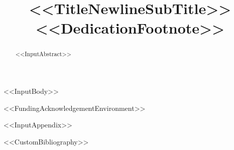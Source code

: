 \documentclass[%
journal = <<TemplateBaseName>>,
manuscript = article,
layout = twocolumn,
<<DocumentClassOptions>>]{achemso}
\title[<<ShortTitle>>]{<<TitleNewlineSubTitle>><<DedicationFootnote>>}
\begin{document}
\begin{abstract}
<<InputAbstract>>
\end{abstract}

<<InputBody>>

<<FundingAcknowledgementEnvironment>>

\appendix
<<InputAppendix>>

<<CustomBibliography>>
\end{document}
